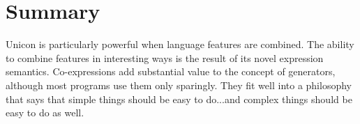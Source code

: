 \section*{Summary}

Unicon is particularly powerful when language features are
combined. The ability to combine features in interesting ways is the
result of its novel expression semantics. Co-expressions add
substantial value to the concept of generators,
although most programs use them only sparingly. They fit well into a
philosophy that says that simple things should be easy to do...and
complex things should be easy to do as well.

